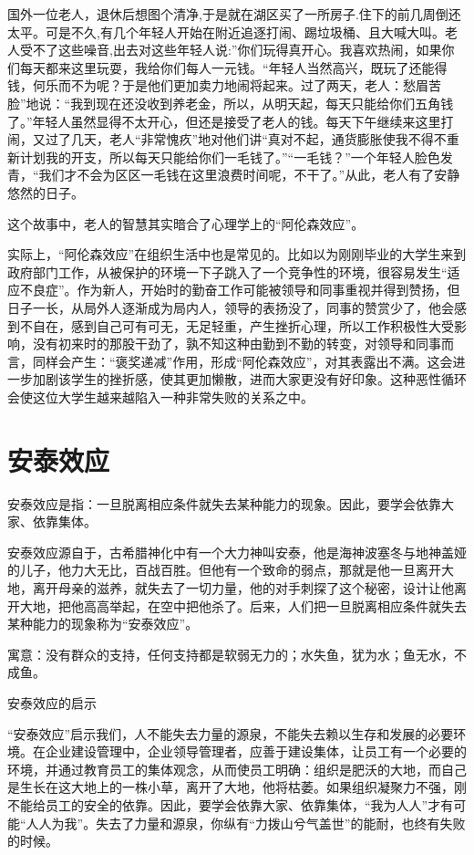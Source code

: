 \documentclass[11pt]{ctexart}
\begin{document}
国外一位老人，退休后想图个清净,于是就在湖区买了一所房子.住下的前几周倒还太平。可是不久,有几个年轻人开始在附近追逐打闹、踢垃圾桶、且大喊大叫。老人受不了这些噪音,出去对这些年轻人说:”你们玩得真开心。我喜欢热闹，如果你们每天都来这里玩耍，我给你们每人一元钱。“年轻人当然高兴，既玩了还能得钱，何乐而不为呢？于是他们更加卖力地闹将起来。过了两天，老人：愁眉苦脸”地说：“我到现在还没收到养老金，所以，从明天起，每天只能给你们五角钱了。”年轻人虽然显得不太开心，但还是接受了老人的钱。每天下午继续来这里打闹，又过了几天，老人“非常愧疚”地对他们讲“真对不起，通货膨胀使我不得不重新计划我的开支，所以每天只能给你们一毛钱了。”“一毛钱？”一个年轻人脸色发青，“我们才不会为区区一毛钱在这里浪费时间呢，不干了。”从此，老人有了安静悠然的日子。

这个故事中，老人的智慧其实暗合了心理学上的“阿伦森效应”。

实际上，“阿伦森效应”在组织生活中也是常见的。比如以为刚刚毕业的大学生来到政府部门工作，从被保护的环境一下子跳入了一个竞争性的环境，很容易发生“适应不良症”。作为新人，开始时的勤奋工作可能被领导和同事重视并得到赞扬，但日子一长，从局外人逐渐成为局内人，领导的表扬没了，同事的赞赏少了，他会感到不自在，感到自己可有可无，无足轻重，产生挫折心理，所以工作积极性大受影响，没有初来时的那股干劲了，孰不知这种由勤到不勤的转变，对领导和同事而言，同样会产生：“褒奖递减”作用，形成“阿伦森效应”，对其表露出不满。这会进一步加剧该学生的挫折感，使其更加懒散，进而大家更没有好印象。这种恶性循环会使这位大学生越来越陷入一种非常失败的关系之中。
\section{安泰效应}
\label{sec-3}


安泰效应是指：一旦脱离相应条件就失去某种能力的现象。因此，要学会依靠大家、依靠集体。

安泰效应源自于，古希腊神化中有一个大力神叫安泰，他是海神波塞冬与地神盖娅的儿子，他力大无比，百战百胜。但他有一个致命的弱点，那就是他一旦离开大地，离开母亲的滋养，就失去了一切力量，他的对手刺探了这个秘密，设计让他离开大地，把他高高举起，在空中把他杀了。后来，人们把一旦脱离相应条件就失去某种能力的现象称为“安泰效应”。

寓意：没有群众的支持，任何支持都是软弱无力的；水失鱼，犹为水；鱼无水，不成鱼。

安泰效应的启示

“安泰效应”启示我们，人不能失去力量的源泉，不能失去赖以生存和发展的必要环境。在企业建设管理中，企业领导管理者，应善于建设集体，让员工有一个必要的环境，并通过教育员工的集体观念，从而使员工明确：组织是肥沃的大地，而自己是生长在这大地上的一株小草，离开了大地，他将枯萎。如果组织凝聚力不强，刚不能给员工的安全的依靠。因此，要学会依靠大家、依靠集体，“我为人人”才有可能“人人为我”。失去了力量和源泉，你纵有“力拨山兮气盖世”的能耐，也终有失败的时候。
\end{document}
